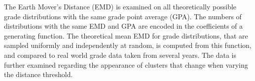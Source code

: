 \documentclass[12pt,letterpaper,oneside,openany]{book}
\newcommand{\pglen}{390}
\newcommand{\vs}{\vspace{0.7cm}}
\begin{document}
\vspace{1cm}
\doublespace
\noindent 
The Earth Mover's Distance (EMD) is examined on all theoretically possible grade distributions with the same grade point average (GPA). The numbers of distributions with the same EMD and GPA are encoded in the coefficients of a generating function. The theoretical mean EMD for grade distributions, that are sampled uniformly and independently at random, is computed from this function, and compared to real world grade data taken from several years. The data is further examined regarding the appearance of clusters that change when varying the distance threshold.


\clearpage


\singlespace
\vspace{2cm}

\clearpage

\begin{singlespace}
\tableofcontents 
\end{singlespace}
\clearpage

\doublespace
\listoffigures
\listoftables
\clearpage
{}

\doublespacing
\setcounter{chapter}{1}
\setcounter{section}{0}
\setcounter{table}{0}
\end{document}
